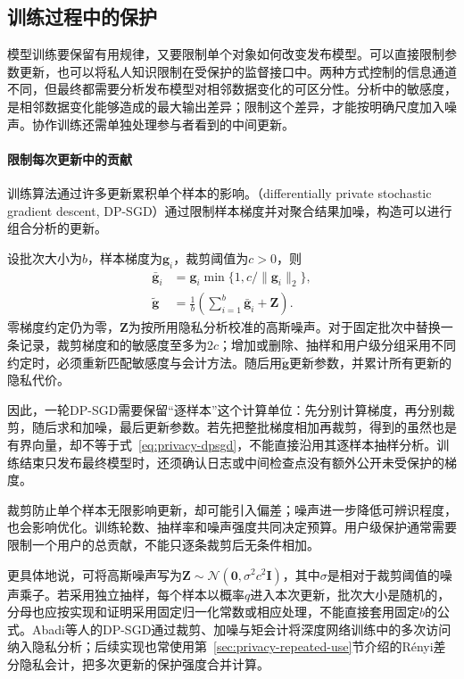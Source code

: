 \subsection{训练过程中的保护}
\label{sec:privacy-training-influence}
\label{sec:privacy-collaborative-computation}

模型训练要保留有用规律，又要限制单个对象如何改变发布模型。可以直接限制参数更新，也可以将私人知识限制在受保护的监督接口中。两种方式控制的信息通道不同，但最终都需要分析发布模型对相邻数据变化的可区分性。分析中的敏感度，是相邻数据变化能够造成的最大输出差异；限制这个差异，才能按明确尺度加入噪声。协作训练还需单独处理参与者看到的中间更新。

\paragraph{限制每次更新中的贡献}

训练算法通过许多更新累积单个样本的影响。（differentially private stochastic gradient descent, DP-SGD）通过限制样本梯度并对聚合结果加噪，构造可以进行组合分析的更新。

设批次大小为$b$，样本梯度为$\bm g_i$，裁剪阈值为$c>0$，则
\begin{equation}
 \begin{aligned}
 \bar{\bm g}_i
 &=\bm g_i\min\{1,c/\|\bm g_i\|_2\},\\
 \tilde{\bm g}
 &=\frac{1}{b}\left(\sum_{i=1}^{b}\bar{\bm g}_i+\bm Z\right).
 \end{aligned}
 \label{eq:privacy-dpsgd}
\end{equation}
零梯度约定仍为零，$\bm Z$为按所用隐私分析校准的高斯噪声。对于固定批次中替换一条记录，裁剪梯度和的敏感度至多为$2c$；增加或删除、抽样和用户级分组采用不同约定时，必须重新匹配敏感度与会计方法。随后用$\tilde{\bm g}$更新参数，并累计所有更新的隐私代价。

因此，一轮DP-SGD需要保留“逐样本”这个计算单位：先分别计算梯度，再分别裁剪，随后求和加噪，最后更新参数。若先把整批梯度相加再裁剪，得到的虽然也是有界向量，却不等于式~\eqref{eq:privacy-dpsgd}，不能直接沿用其逐样本抽样分析。训练结束只发布最终模型时，还须确认日志或中间检查点没有额外公开未受保护的梯度。

裁剪防止单个样本无限影响更新，却可能引入偏差；噪声进一步降低可辨识程度，也会影响优化。训练轮数、抽样率和噪声强度共同决定预算。用户级保护通常需要限制一个用户的总贡献，不能只逐条裁剪后无条件相加。

更具体地说，可将高斯噪声写为$\bm Z\sim\mathcal N(\bm0,\sigma^2c^2\bm I)$，其中$\sigma$是相对于裁剪阈值的噪声乘子。若采用独立抽样，每个样本以概率$q$进入本次更新，批次大小是随机的，分母也应按实现和证明采用固定归一化常数或相应处理，不能直接套用固定$b$的公式。Abadi等人的DP-SGD通过裁剪、加噪与矩会计将深度网络训练中的多次访问纳入隐私分析；后续实现也常使用第~\ref{sec:privacy-repeated-use}节介绍的Rényi差分隐私会计，把多次更新的保护强度合并计算。

